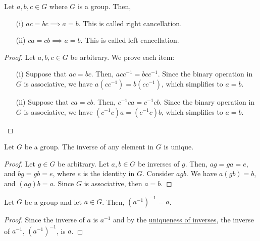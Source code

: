         \begin{thm}
            Let \(a, b, c\in G\) where \(G\) is a group. Then,
            \begin{enumerate}
                \item[(i)] \(ac = bc \implies a = b\). This is called right cancellation.
                \item[(ii)] \(ca = cb \implies a = b\). This is called left cancellation.
            \end{enumerate}
        \end{thm}

        \begin{proof}
            Let \(a, b, c\in G\) be arbitrary. We prove each item:
            \begin{enumerate}
                \item[(i)] Suppose that \(ac = bc\). Then, \(acc^{-1} = bcc^{-1}\). Since the binary operation in \(G\) is associative, we have \(a(cc^{-1}) = b(cc^{-1})\), which simplifies to \(a = b\).

                \item[(ii)] Suppose that \(ca = cb\). Then, \(c^{-1}ca = c^{-1}cb\). Since the binary operation in \(G\) is associative, we have \((c^{-1}c)a = (c^{-1}c)b\), which simplifies to \(a = b\).
            \end{enumerate}
        \end{proof}

        \begin{thm}
            Let \(G\) be a group. The inverse of any element in \(G\) is unique.
        \end{thm}

        \begin{proof}
            Let \(g\in G\) be arbitrary. Let \(a, b\in G\) be inverses of \(g\). Then, \(ag = ga = e\), and \(bg = gb = e\), where \(e\) is the identity in \(G\). Consider \(agb\). We have \(a(gb) = b\), and \((ag)b = a\). Since \(G\) is associative, then \(a = b\).
        \end{proof}

        \begin{thm}
            Let \(G\) be a group and let \(a \in G\). Then, \((a^{-1})^{-1} = a\).
        \end{thm}

        \begin{proof}
            Since the inverse of \(a\) is \(a^{-1}\) and by the \hyperref[thm:unique-inverse]{uniqueness of inverses}, the inverse of \(a^{-1}\), \((a^{-1})^{-1}\), is \(a\).
        \end{proof}

